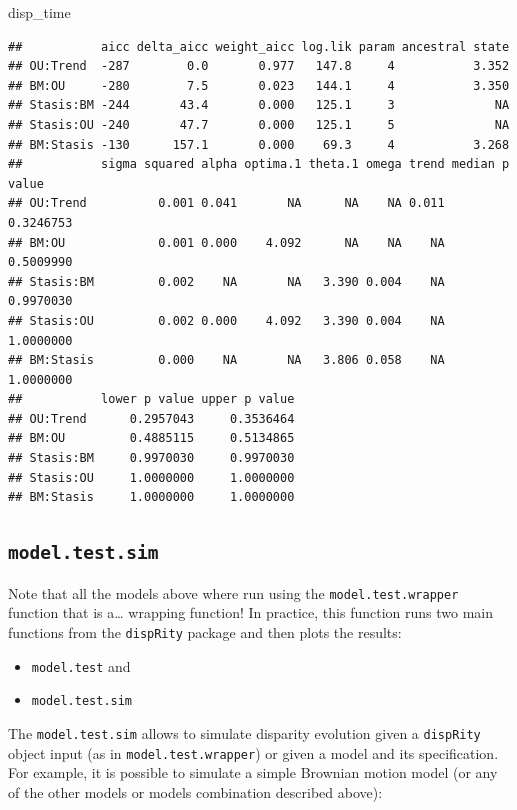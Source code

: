 \documentclass[]{book}
\newenvironment{Shaded}{\begin{snugshade}}{\end{snugshade}}
\newcommand{\NormalTok}[1]{#1}
\providecommand{\tightlist}{%
  \setlength{\itemsep}{0pt}\setlength{\parskip}{0pt}}
\begin{document}
\begin{Shaded}
\begin{Highlighting}[]
\NormalTok{disp_time}
\end{Highlighting}
\end{Shaded}

\begin{verbatim}
##           aicc delta_aicc weight_aicc log.lik param ancestral state
## OU:Trend  -287        0.0       0.977   147.8     4           3.352
## BM:OU     -280        7.5       0.023   144.1     4           3.350
## Stasis:BM -244       43.4       0.000   125.1     3              NA
## Stasis:OU -240       47.7       0.000   125.1     5              NA
## BM:Stasis -130      157.1       0.000    69.3     4           3.268
##           sigma squared alpha optima.1 theta.1 omega trend median p value
## OU:Trend          0.001 0.041       NA      NA    NA 0.011      0.3246753
## BM:OU             0.001 0.000    4.092      NA    NA    NA      0.5009990
## Stasis:BM         0.002    NA       NA   3.390 0.004    NA      0.9970030
## Stasis:OU         0.002 0.000    4.092   3.390 0.004    NA      1.0000000
## BM:Stasis         0.000    NA       NA   3.806 0.058    NA      1.0000000
##           lower p value upper p value
## OU:Trend      0.2957043     0.3536464
## BM:OU         0.4885115     0.5134865
## Stasis:BM     0.9970030     0.9970030
## Stasis:OU     1.0000000     1.0000000
## BM:Stasis     1.0000000     1.0000000
\end{verbatim}

\hypertarget{model.test.sim}{%
\subsection{\texorpdfstring{\texttt{model.test.sim}}{model.test.sim}}\label{model.test.sim}}

Note that all the models above where run using the \texttt{model.test.wrapper} function that is a\ldots{} wrapping function!
In practice, this function runs two main functions from the \texttt{dispRity} package and then plots the results:

\begin{itemize}
\tightlist
\item
  \texttt{model.test} and
\item
  \texttt{model.test.sim}
\end{itemize}

The \texttt{model.test.sim} allows to simulate disparity evolution given a \texttt{dispRity} object input (as in \texttt{model.test.wrapper}) or given a model and its specification.
For example, it is possible to simulate a simple Brownian motion model (or any of the other models or models combination described above):
\end{document}
